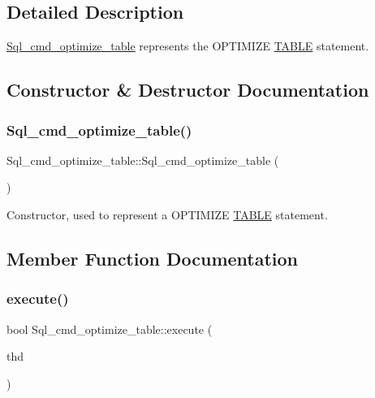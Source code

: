 \subsection{Detailed Description}
\mbox{\hyperlink{classSql__cmd__optimize__table}{Sql\+\_\+cmd\+\_\+optimize\+\_\+table}} represents the O\+P\+T\+I\+M\+I\+ZE \mbox{\hyperlink{structTABLE}{T\+A\+B\+LE}} statement. 

\subsection{Constructor \& Destructor Documentation}
\mbox{\label{classSql__cmd__optimize__table_aa212f41ab3e7702a041070b8c6f570e3}} 
\subsubsection{\texorpdfstring{Sql\+\_\+cmd\+\_\+optimize\+\_\+table()}{Sql\_cmd\_optimize\_table()}}
{\footnotesize\ttfamily Sql\+\_\+cmd\+\_\+optimize\+\_\+table\+::\+Sql\+\_\+cmd\+\_\+optimize\+\_\+table (\begin{DoxyParamCaption}{ }\end{DoxyParamCaption})\hspace{0.3cm}{\ttfamily [inline]}}

Constructor, used to represent a O\+P\+T\+I\+M\+I\+ZE \mbox{\hyperlink{structTABLE}{T\+A\+B\+LE}} statement. 

\subsection{Member Function Documentation}
\mbox{\label{classSql__cmd__optimize__table_a91077d83c5c27dae2f78a4b47c8f06a3}} 
\subsubsection{\texorpdfstring{execute()}{execute()}}
{\footnotesize\ttfamily bool Sql\+\_\+cmd\+\_\+optimize\+\_\+table\+::execute (\begin{DoxyParamCaption}\item[{T\+HD $\ast$}]{thd }\end{DoxyParamCaption})\hspace{0.3cm}{\ttfamily [virtual]}}

